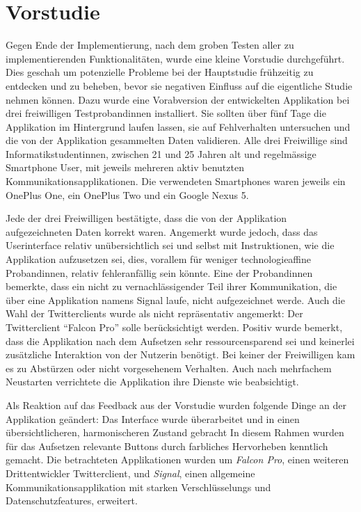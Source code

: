 \section{Vorstudie}

Gegen Ende der Implementierung, nach dem groben Testen aller zu implementierenden Funktionalitäten, wurde eine kleine Vorstudie durchgeführt.
Dies geschah um potenzielle Probleme bei der Hauptstudie frühzeitig zu entdecken und zu beheben, bevor sie negativen Einfluss auf die eigentliche Studie nehmen können.
Dazu wurde eine Vorabversion der entwickelten Applikation bei drei freiwilligen Testprobandinnen installiert.
Sie sollten über fünf Tage die Applikation im Hintergrund laufen lassen, sie auf Fehlverhalten untersuchen und die von der Applikation gesammelten Daten validieren.
Alle drei Freiwillige sind Informatikstudentinnen, zwischen 21 und 25 Jahren alt und regelmässige Smartphone User, mit jeweils mehreren aktiv benutzten Kommunikationsapplikationen.
Die verwendeten Smartphones waren jeweils ein OnePlus One, ein OnePlus Two und ein Google Nexus 5.
\par
Jede der drei Freiwilligen bestätigte, dass die von der Applikation aufgezeichneten Daten korrekt waren.
Angemerkt wurde jedoch, dass das Userinterface relativ unübersichtlich sei und selbst mit Instruktionen, wie die Applikation aufzusetzen sei, dies, vorallem für weniger technologieaffine Probandinnen, relativ fehleranfällig sein könnte.
Eine der Probandinnen bemerkte, dass ein nicht zu vernachlässigender Teil ihrer Kommunikation, die über eine Applikation namens Signal laufe, nicht aufgezeichnet werde.
Auch die Wahl der Twitterclients wurde als nicht repräsentativ angemerkt:
Der Twitterclient "`Falcon Pro"' solle berücksichtigt werden.
Positiv wurde bemerkt, dass die Applikation nach dem Aufsetzen sehr ressourcensparend sei und keinerlei zusätzliche Interaktion von der Nutzerin benötigt.
Bei keiner der Freiwilligen kam es zu Abstürzen oder nicht vorgesehenem Verhalten. Auch nach mehrfachem Neustarten verrichtete die Applikation ihre Dienste wie beabsichtigt.
\par
Als Reaktion auf das Feedback aus der Vorstudie wurden folgende Dinge an der Applikation geändert:
Das Interface wurde überarbeitet und in einen übersichtlicheren, harmonischeren Zustand gebracht
In diesem Rahmen wurden für das Aufsetzen relevante Buttons durch farbliches Hervorheben kenntlich gemacht.
Die betrachteten Applikationen wurden um \emph{Falcon Pro}, einen weiteren Drittentwickler Twitterclient, und \emph{Signal}, einen allgemeine Kommunikationsapplikation mit starken Verschlüsselungs und Datenschutzfeatures, erweitert.
